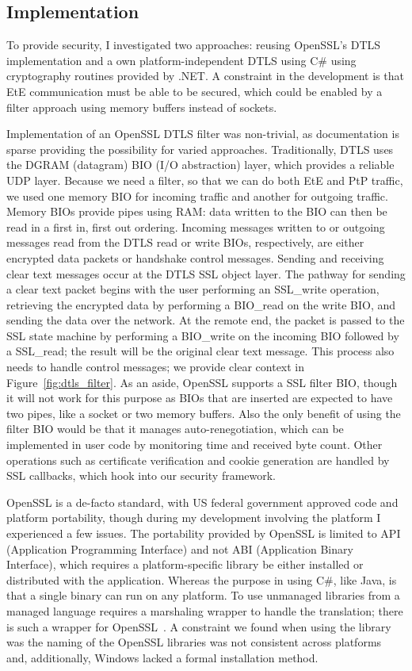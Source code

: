 \subsection{Implementation}
To provide security, I investigated two approaches:  reusing OpenSSL's DTLS
implementation and a own platform-independent DTLS using C\# using cryptography
routines provided by .NET.  A constraint in the development is that EtE
communication must be able to be secured, which could be enabled by a filter
approach using memory buffers instead of sockets.

Implementation of an OpenSSL DTLS filter was non-trivial, as documentation is
sparse providing the possibility for varied approaches.  Traditionally, DTLS
uses the DGRAM (datagram) BIO (I/O abstraction) layer, which provides a reliable
UDP layer.  Because we need a filter, so that we can do both EtE and PtP traffic,
we used one memory BIO  for incoming traffic and another for outgoing traffic.
Memory BIOs provide pipes using RAM: data written to the BIO can then be read
in a first in, first out ordering.  Incoming messages written to or outgoing
messages read from the DTLS read or write BIOs, respectively, are 
either encrypted data packets or handshake control messages.  Sending and 
receiving clear text messages occur at the DTLS SSL object layer.  The pathway
for sending a clear text packet begins with the user performing an SSL\_write
operation, retrieving the encrypted data by performing a BIO\_read on the write
BIO, and sending the data over the network.  At the remote end, the packet is
passed to the SSL state machine by performing a BIO\_write on the incoming BIO
followed by a SSL\_read; the result will be the original clear text message.
This process also needs to handle control messages; we provide clear context in
Figure~\ref{fig:dtls_filter}.  As an aside, OpenSSL supports a SSL filter
BIO, though it will not work for this purpose as BIOs that are inserted are
expected to have two pipes, like a socket or two memory buffers.  Also the only
benefit of using the filter BIO would be that it manages auto-renegotiation,
which can be implemented in user code by monitoring time and received byte
count.  Other operations such as certificate verification and cookie generation
are handled by SSL callbacks, which hook into our security framework.

OpenSSL is a de-facto standard, with US federal government approved code and 
platform portability, though during my development involving the platform I
experienced a few issues.  The portability provided by OpenSSL is limited to
API (Application Programming Interface) and not ABI (Application Binary
Interface), which requires a platform-specific library be either installed or
distributed with the application.  Whereas the purpose in using C\#, like Java,
is that a single binary can run on any platform.  To use unmanaged libraries
from a managed language requires a marshaling wrapper to handle the
translation; there is such a wrapper for OpenSSL~\cite{openssl.net}.  A
constraint we found when using the library was the naming of the OpenSSL
libraries was not consistent across platforms and, additionally, Windows lacked
a formal installation method.

